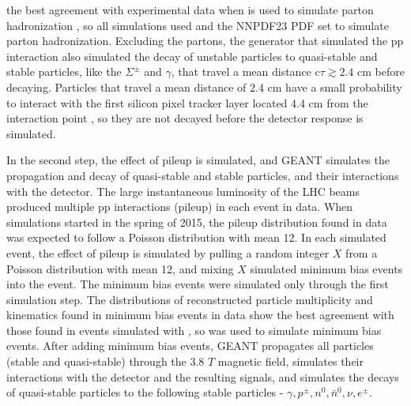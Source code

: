 the best agreement with experimental data when \PYTHIA is used to simulate parton hadronization \cite{pythiaForHadronization}, so all 
simulations used \PYTHIA and the NNPDF23 PDF set \cite{nnpdf} to simulate parton hadronization.  Excluding the partons, the \MC generator 
that simulated the pp interaction also simulated the decay of unstable particles to quasi-stable and stable particles, like the $\Sigma^{\pm}$ 
and $\gamma$, that travel a mean distance c$\tau \gtrsim 2.4$ cm before decaying.  Particles that travel a mean distance of 2.4 cm have a 
small probability to interact with the first silicon pixel tracker layer located 4.4 cm from the interaction point \cite{cmsTdrPhysPerformance}, 
so they are not decayed before the detector response is simulated.


In the second step, the effect of pileup is simulated, and GEANT \cite{geant4} simulates the propagation and decay of quasi-stable and stable 
particles, and their interactions with the detector.  The large instantaneous luminosity of the LHC beams produced multiple pp interactions 
(pileup) in each event in data.  When \MC simulations started in the spring of 2015, the pileup distribution found in data was expected to 
follow a Poisson distribution with mean 12.  In each simulated event, the effect of pileup is simulated by pulling a 
random integer $X$ from a Poisson distribution with mean 12, and mixing $X$ simulated minimum bias events into the event.  The 
minimum bias events were simulated only through the first simulation step.  The distributions of reconstructed particle multiplicity and 
kinematics found in minimum bias events in data show the best agreement with those found in events simulated with \PYTHIA 
\cite{pythiaForHadronization}, so \PYTHIA was used to simulate minimum bias events.  After adding minimum bias events, GEANT propagates all 
particles (stable and quasi-stable) through the 3.8 $\unit{T}$ magnetic field, simulates their interactions with the detector and the resulting 
signals, and simulates the decays of quasi-stable particles to the following stable particles - $\gamma,p^{\pm},n^{0},\bar{n}^{0},\nu,e^{\pm}$.

